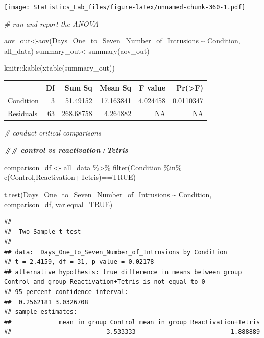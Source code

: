 \documentclass[
]{book}
\newenvironment{Shaded}{\begin{snugshade}}{\end{snugshade}}
\newcommand{\AttributeTok}[1]{\textcolor[rgb]{0.77,0.63,0.00}{#1}}
\newcommand{\CommentTok}[1]{\textcolor[rgb]{0.56,0.35,0.01}{\textit{#1}}}
\newcommand{\ConstantTok}[1]{\textcolor[rgb]{0.00,0.00,0.00}{#1}}
\newcommand{\DocumentationTok}[1]{\textcolor[rgb]{0.56,0.35,0.01}{\textbf{\textit{#1}}}}
\newcommand{\FunctionTok}[1]{\textcolor[rgb]{0.00,0.00,0.00}{#1}}
\newcommand{\NormalTok}[1]{#1}
\newcommand{\OtherTok}[1]{\textcolor[rgb]{0.56,0.35,0.01}{#1}}
\newcommand{\SpecialCharTok}[1]{\textcolor[rgb]{0.00,0.00,0.00}{#1}}
\newcommand{\StringTok}[1]{\textcolor[rgb]{0.31,0.60,0.02}{#1}}
\begin{document}
\texttt{[image: Statistics\_Lab\_files/figure-latex/unnamed-chunk-360-1.pdf]}

\begin{Shaded}
\begin{Highlighting}[]
\CommentTok{\# run and report the ANOVA}

\NormalTok{aov\_out}\OtherTok{\textless{}{-}}\FunctionTok{aov}\NormalTok{(Days\_One\_to\_Seven\_Number\_of\_Intrusions }\SpecialCharTok{\textasciitilde{}}\NormalTok{ Condition, all\_data)}
\NormalTok{summary\_out}\OtherTok{\textless{}{-}}\FunctionTok{summary}\NormalTok{(aov\_out)}

\NormalTok{knitr}\SpecialCharTok{::}\FunctionTok{kable}\NormalTok{(}\FunctionTok{xtable}\NormalTok{(summary\_out))}
\end{Highlighting}
\end{Shaded}

\begin{tabular}{l|r|r|r|r|r}
\hline
  & Df & Sum Sq & Mean Sq & F value & Pr(>F)\\
\hline
Condition & 3 & 51.49152 & 17.163841 & 4.024458 & 0.0110347\\
\hline
Residuals & 63 & 268.68758 & 4.264882 & NA & NA\\
\hline
\end{tabular}

\begin{Shaded}
\begin{Highlighting}[]
\CommentTok{\# conduct critical comparisons}

\DocumentationTok{\#\# control vs reactivation+Tetris}

\NormalTok{comparison\_df }\OtherTok{\textless{}{-}}\NormalTok{ all\_data }\SpecialCharTok{\%\textgreater{}\%} 
                  \FunctionTok{filter}\NormalTok{(Condition }\SpecialCharTok{\%in\%} \FunctionTok{c}\NormalTok{(}\StringTok{\textquotesingle{}Control\textquotesingle{}}\NormalTok{,}\StringTok{\textquotesingle{}Reactivation+Tetris\textquotesingle{}}\NormalTok{)}\SpecialCharTok{==}\ConstantTok{TRUE}\NormalTok{)}
                        
\FunctionTok{t.test}\NormalTok{(Days\_One\_to\_Seven\_Number\_of\_Intrusions }\SpecialCharTok{\textasciitilde{}}\NormalTok{ Condition, }
\NormalTok{       comparison\_df,}
       \AttributeTok{var.equal=}\ConstantTok{TRUE}\NormalTok{)}
\end{Highlighting}
\end{Shaded}

\begin{verbatim}
## 
##  Two Sample t-test
## 
## data:  Days_One_to_Seven_Number_of_Intrusions by Condition
## t = 2.4159, df = 31, p-value = 0.02178
## alternative hypothesis: true difference in means between group Control and group Reactivation+Tetris is not equal to 0
## 95 percent confidence interval:
##  0.2562181 3.0326708
## sample estimates:
##             mean in group Control mean in group Reactivation+Tetris 
##                          3.533333                          1.888889
\end{verbatim}
\end{document}

